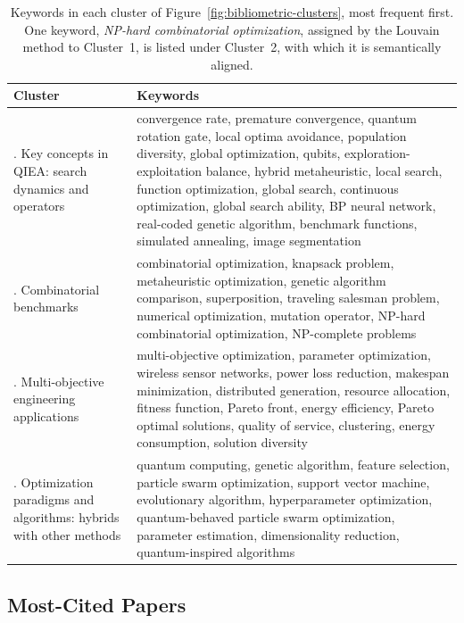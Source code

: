 \begin{table}[H]
  \centering
  \small
  \caption{Keywords in each cluster of
    Figure~\ref{fig:bibliometric-clusters}, most frequent first. One
    keyword, \emph{NP-hard combinatorial optimization}, assigned by the
    Louvain method to Cluster~1, is listed under Cluster~2, with which it
    is semantically aligned.}
  \label{tab:bibliometric-clusters}
  \begin{tabularx}{\linewidth}{@{}>{\raggedright\arraybackslash}p{3.2cm}>{\raggedright\arraybackslash}X@{}}
    \toprule
    Cluster & Keywords \\
    \midrule
    1. Key concepts in QIEA: search dynamics and operators &
      convergence rate, premature convergence, quantum rotation gate,
      local optima avoidance, population diversity, global optimization,
      qubits, exploration-exploitation balance, hybrid metaheuristic,
      local search, function optimization, global search, continuous
      optimization, global search ability, BP neural network,
      real-coded genetic algorithm, benchmark functions, simulated
      annealing, image segmentation \\
    2. Combinatorial benchmarks &
      combinatorial optimization, knapsack problem, metaheuristic
      optimization, genetic algorithm comparison, superposition,
      traveling salesman problem, numerical optimization, mutation
      operator, NP-hard combinatorial optimization, NP-complete problems \\
    3. Multi-objective engineering applications &
      multi-objective optimization, parameter optimization, wireless
      sensor networks, power loss reduction, makespan minimization,
      distributed generation, resource allocation, fitness function,
      Pareto front, energy efficiency, Pareto optimal solutions, quality
      of service, clustering, energy consumption, solution diversity \\
    4. Optimization paradigms and algorithms: hybrids with other methods &
      quantum computing, genetic algorithm, feature selection, particle
      swarm optimization, support vector machine, evolutionary
      algorithm, hyperparameter optimization, quantum-behaved particle
      swarm optimization, parameter estimation, dimensionality
      reduction, quantum-inspired algorithms \\
    \bottomrule
  \end{tabularx}
\end{table}

\subsection{Most-Cited Papers}
\label{sec:bibliometric:top-cited}

